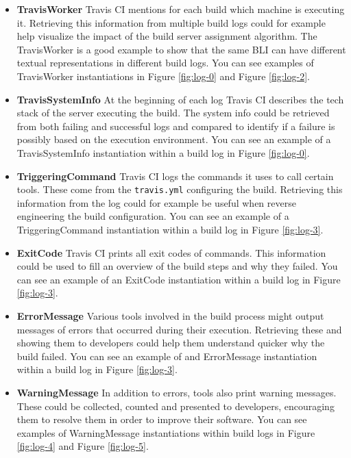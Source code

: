 \documentclass[\myrootdir/main.tex]{subfiles}
\begin{document}
\begin{itemize}
	\item \textbf{TravisWorker} Travis CI mentions for each build which machine is executing it.
	      Retrieving this information from multiple build logs could for example help visualize the impact of the build server assignment algorithm.
	      The TravisWorker is a good example to show that the same BLI can have different textual representations in different build logs.
	      You can see examples of TravisWorker instantiations in Figure \ref{fig:log-0} and Figure \ref{fig:log-2}.

	\item \textbf{TravisSystemInfo} At the beginning of each log Travis CI describes the tech stack of the server executing the build.
	      The system info could be retrieved from both failing and successful logs and compared to identify if a failure is possibly based on the execution environment.
	      You can see an example of a TravisSystemInfo instantiation within a build log in Figure \ref{fig:log-0}.

	\item \textbf{TriggeringCommand} Travis CI logs the commands it uses to call certain tools.
	      These come from the \texttt{travis.yml} configuring the build.
	      Retrieving this information from the log could for example be useful when reverse engineering the build configuration.
	      You can see an example of a TriggeringCommand instantiation within a build log in Figure \ref{fig:log-3}.

	\item \textbf{ExitCode} Travis CI prints all exit codes of commands.
	      This information could be used to fill an overview of the build steps and why they failed.
	      You can see an example of an ExitCode instantiation within a build log in Figure \ref{fig:log-3}.

	\item \textbf{ErrorMessage} Various tools involved in the build process might output messages of errors that occurred during their execution.
	      Retrieving these and showing them to developers could help them understand quicker why the build failed.
	      You can see an example of and ErrorMessage instantiation within a build log in Figure \ref{fig:log-3}.

	\item \textbf{WarningMessage} In addition to errors, tools also print warning messages.
	      These could be collected, counted and presented to developers, encouraging them to resolve them in order to improve their software.
	      You can see examples of WarningMessage instantiations within build logs in Figure \ref{fig:log-4} and Figure \ref{fig:log-5}.

\end{itemize}
\end{document}
